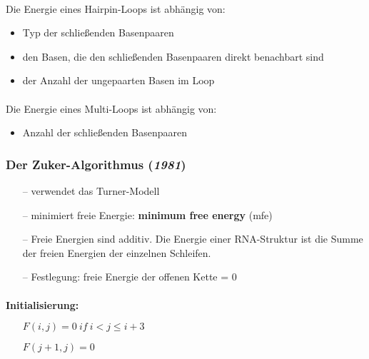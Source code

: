 \paragraph{}
Die Energie eines Hairpin-Loops ist abh\"angig von:
\begin{itemize}
	\item Typ der schließenden Basenpaaren
	\item den Basen, die den schließenden Basenpaaren direkt benachbart sind
	\item der Anzahl der ungepaarten Basen im Loop
\end{itemize}
\paragraph{}
Die Energie eines Multi-Loops ist abh\"angig von:
\begin{itemize}
	\item Anzahl der schließenden Basenpaaren
\end{itemize}

\subsubsection{Der Zuker-Algorithmus (\textit{1981})}
\begin{itemize}
\item[--]verwendet das Turner-Modell
\item[--]minimiert freie Energie: \textbf{minimum free energy} (mfe)
\item[--]Freie Energien sind additiv. Die Energie einer RNA-Struktur ist die Summe der freien Energien der einzelnen Schleifen.
\item[--]Festlegung: freie Energie der offenen Kette = 0
\end{itemize}
\paragraph{}
\textbf{Initialisierung:}
\begin{itemize}
	\item[] $F(i,j)=0\ if \ i<j\le i+3$ 
	\item[] $F(j+1, j) = 0$
\end{itemize}

